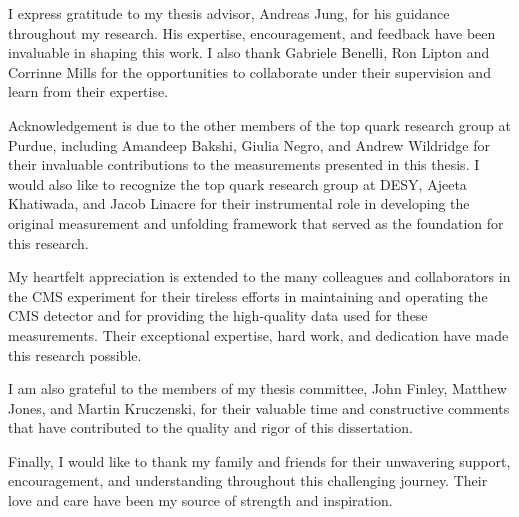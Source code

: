 \begin{acknowledgments}
I express gratitude to my thesis advisor, Andreas Jung, for his guidance throughout my research. His expertise, encouragement, and feedback have been invaluable in shaping this work. 
I also thank Gabriele Benelli, Ron Lipton and Corrinne Mills for the opportunities to collaborate under their supervision and learn from their expertise.

Acknowledgement is due to the other members of the top quark research group at Purdue, including Amandeep Bakshi, Giulia Negro, and Andrew Wildridge for their invaluable contributions to the measurements presented in this thesis. 
I would also like to recognize the top quark research group at DESY, Ajeeta Khatiwada, and Jacob Linacre for their instrumental role in developing the original measurement and unfolding framework that served as the foundation for this research.

My heartfelt appreciation is extended to the many colleagues and collaborators in the CMS experiment for their tireless efforts in maintaining and operating the CMS detector and for providing the high-quality data used for these measurements. 
Their exceptional expertise, hard work, and dedication have made this research possible.

I am also grateful to the members of my thesis committee, John Finley, Matthew Jones, and Martin Kruczenski, for their valuable time and constructive comments that have contributed to the quality and rigor of this dissertation.

Finally, I would like to thank my family and friends for their unwavering support, encouragement, and understanding throughout this challenging journey. 
Their love and care have been my source of strength and inspiration.
\end{acknowledgments}

%

\tableofcontents

